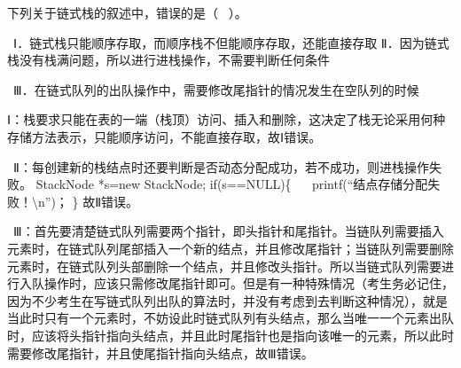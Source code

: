 \question 下列关于链式栈的叙述中，错误的是（ ~）。

~Ⅰ．链式栈只能顺序存取，而顺序栈不但能顺序存取，还能直接存取
Ⅱ．因为链式栈没有栈满问题，所以进行进栈操作，不需要判断任何条件

~Ⅲ．在链式队列的出队操作中，需要修改尾指针的情况发生在空队列的时候
\par{}
\begin{solution}Ⅰ：栈要求只能在表的一端（栈顶）访问、插入和删除，这决定了栈无论采用何种存储方法表示，只能顺序访问，不能直接存取，故Ⅰ错误。

~Ⅱ：每创建新的栈结点时还要判断是否动态分配成功，若不成功，则进栈操作失败。
StackNode *s=new StackNode; if(s==NULL)\{ ~
~printf(``结点存储分配失败！\textbackslash{}n'')； \} 故Ⅱ错误。

~Ⅲ：首先要清楚链式队列需要两个指针，即头指针和尾指针。当链队列需要插入元素时，在链式队列尾部插入一个新的结点，并且修改尾指针；当链队列需要删除元素时，在链式队列头部删除一个结点，并且修改头指针。所以当链式队列需要进行入队操作时，应该只需修改尾指针即可。但是有一种特殊情况（考生务必记住，因为不少考生在写链式队列出队的算法时，并没有考虑到去判断这种情况），就是当此时只有一个元素时，不妨设此时链式队列有头结点，那么当唯一一个元素出队时，应该将头指针指向头结点，并且此时尾指针也是指向该唯一的元素，所以此时需要修改尾指针，并且使尾指针指向头结点，故Ⅲ错误。
\end{solution}
